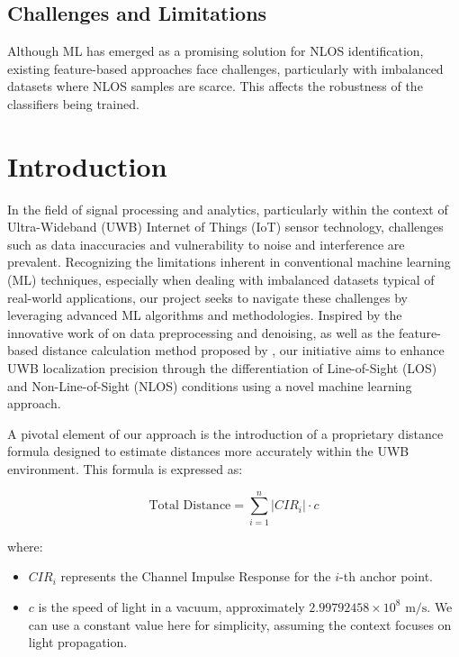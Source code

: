\documentclass[
	article, %
	11pt, %
	draft, %
]{CSUniSchoolLabReport}
\begin{document}
\subsection{Challenges and Limitations}\label{Challenges and Limitations}
Although ML has emerged as a promising solution for NLOS identification, existing feature-based approaches face challenges, particularly with imbalanced datasets where NLOS samples are scarce. This affects the robustness of the classifiers being trained.


\section{Introduction}\label{introduction}
In the field of signal processing and analytics, particularly within the context of Ultra-Wideband (UWB) Internet of Things (IoT) sensor technology, challenges such as data inaccuracies and vulnerability to noise and interference are prevalent. Recognizing the limitations inherent in conventional machine learning (ML) techniques, especially when dealing with imbalanced datasets typical of real-world applications, our project seeks to navigate these challenges by leveraging advanced ML algorithms and methodologies. Inspired by the innovative work of \cite{jiang_uwb_2020} on data preprocessing and denoising, as well as the feature-based distance calculation method proposed by \cite{che_feature-based_2022}, our initiative aims to enhance UWB localization precision through the differentiation of Line-of-Sight (LOS) and Non-Line-of-Sight (NLOS) conditions using a novel machine learning approach.

A pivotal element of our approach is the introduction of a proprietary distance formula designed to estimate distances more accurately within the UWB environment. This formula is expressed as:

\begin{equation}
\text{Total Distance} = \sum_{i=1}^{n} |CIR_i| \cdot c
\end{equation}

where:

\begin{itemize}
  \item $CIR_i$ represents the Channel Impulse Response for the $i$-th anchor point.
  \item $c$ is the speed of light in a vacuum, approximately $2.99792458 \times 10^8 \text{ m/s}$. We can use a constant value here for simplicity, assuming the context focuses on light propagation.
\end{itemize}
\end{document}
